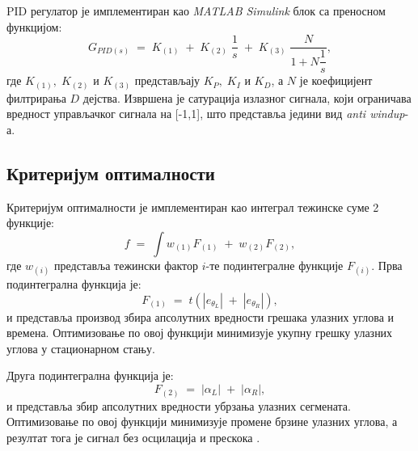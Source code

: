 \documentclass[12pt]{article}
\begin{document}
PID регулатор је имплементиран као \textit{MATLAB Simulink} блок са преносном функцијом: 
\begin{equation}
    G_{PID(s)} \;=\; K_{(1)} \;+\; K_{(2)}\;\dfrac{1}{s} \;+\; K_{(3)}\;\dfrac{N}{1+N\dfrac{1}{s}},
\end{equation}
где $K_{(1)}, \; K_{(2)}$ и $K_{(3)}$ представљају $K_P, \; K_I $ и $ K_D$, а $N$ је коефицијент филтрирања $D$ дејства. Извршена је сатурација излазног сигнала, који ограничава вредност управљачког сигнала на [-1,1], што представља једини вид \textit{anti windup}-а.

\subsection{Критеријум оптималности}
Критеријум оптималности је имплементиран као интеграл тежинске суме 2 функције:
\begin{equation}
    f\;=\;\int{w_{(1)}F_{(1)}\;+\;w_{(2)}F_{(2)}},
\end{equation}
где $w_{(i)}$ представља тежински фактор $i$-те подинтегралне функције $F_{(i)}$. Прва подинтегрална функција је:
\begin{equation}
    F_{(1)}\;=\;t(|e_{\theta_L}|\;+\;|e_{\theta_R}|),
\end{equation}
и представља производ збира апсолутних вредности грешака улазних углова и времена. Оптимизовање по овој функцији минимизује укупну грешку улазних углова у стационарном стању.

Друга подинтегрална функција је:
\begin{equation}
    F_{(2)}\;=\;|\alpha_L|\;+\;|\alpha_R|,
\end{equation}
и представља збир апсолутних вредности убрзања улазних сегмената. Оптимизовање по овој функцији минимизује промене брзине улазних углова, а резултат тога је сигнал без осцилација и прескока .
\end{document}
